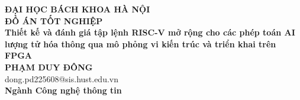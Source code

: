 \documentclass[DoAn.tex]{subfiles}
\begin{document}
\begin{titlepage}
\thispagestyle{empty}
\begin{center}

{\textbf{\large{ĐẠI HỌC BÁCH KHOA HÀ NỘI}}}\\[4cm]

{\textbf{\huge{ ĐỒ ÁN TỐT NGHIỆP}}}\\[1cm]
{\textbf{\Large{Thiết kế và đánh giá tập lệnh RISC-V mở rộng cho các phép toán AI lượng tử hóa thông qua mô phỏng vi kiến trúc và triển khai trên FPGA}}}\\[1cm]

{\textbf{\large{PHẠM DUY ĐÔNG}}}\\
{\large{dong.pd225608@sis.hust.edu.vn}}\\[0.5cm]

{\textbf{\large{Ngành Công nghệ thông tin}}}%

\vspace{2cm}
\begin{table}[H]
\centering
{}
\end{table}
\end{center}



\end{titlepage}
\end{document}
